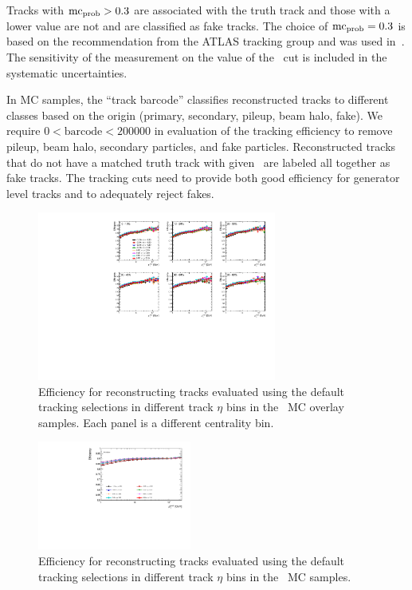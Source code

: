 Tracks with $\mbox{${\mathrm{mc}}_{\mathrm{prob}}$} > 0.3$ are associated with the truth track and those with a lower value are not and are classified as fake tracks.
The choice of $\mbox{${\mathrm{mc}}_{\mathrm{prob}}$} = 0.3$ is based on the recommendation from the ATLAS tracking group and was used in~\cite{201865}.
The sensitivity of the measurement on the value of the \mcprob\ cut is included in the systematic uncertainties.

In MC samples, the ``track barcode'' classifies reconstructed tracks to different classes based on the origin (primary, secondary, pileup, beam halo, fake).
We require $0 < \mathrm{barcode} < 200000$ in evaluation of the tracking efficiency to remove pileup, beam halo, secondary particles, and fake particles.
Reconstructed tracks that do not have a matched truth track with given \mcprob\ are labeled all together as fake tracks.
The tracking cuts need to provide both good efficiency for generator level tracks and to adequately reject fakes.

\begin{figure}
\centering
\includegraphics[width=0.7\textwidth]{figures/main/corrections/eff_cent_trketa_PbPb_ppTight.pdf}
\caption{Efficiency for reconstructing tracks evaluated using the default tracking selections in different track $\eta$ bins in the \pbpb\ MC overlay samples.
Each panel is a different centrality bin.}
\label{fig:pbpbeffdefault_final}
\end{figure}

\begin{figure}
\centering
\includegraphics[width=0.45\textwidth]{figures/main/corrections/eff_cent_trketa_pp_ppTight.pdf}
\caption{Efficiency for reconstructing tracks evaluated using the default tracking selections in different track $\eta$ bins in the \pp\ MC samples.}
\label{fig:ppeffdefault_final}
\end{figure}

